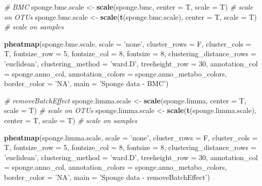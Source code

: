 \documentclass[]{book}
\newenvironment{Shaded}{\begin{snugshade}}{\end{snugshade}}
\newcommand{\KeywordTok}[1]{\textcolor[rgb]{0.13,0.29,0.53}{\textbf{#1}}}
\newcommand{\DataTypeTok}[1]{\textcolor[rgb]{0.13,0.29,0.53}{#1}}
\newcommand{\DecValTok}[1]{\textcolor[rgb]{0.00,0.00,0.81}{#1}}
\newcommand{\StringTok}[1]{\textcolor[rgb]{0.31,0.60,0.02}{#1}}
\newcommand{\CommentTok}[1]{\textcolor[rgb]{0.56,0.35,0.01}{\textit{#1}}}
\newcommand{\NormalTok}[1]{#1}
\begin{document}
\begin{Shaded}
\begin{Highlighting}[]
\CommentTok{# BMC }
\NormalTok{sponge.bmc.scale <-}\StringTok{ }\KeywordTok{scale}\NormalTok{(sponge.bmc, }\DataTypeTok{center =}\NormalTok{ T, }\DataTypeTok{scale =}\NormalTok{ T) }
\CommentTok{# scale on OTUs}
\NormalTok{sponge.bmc.scale <-}\StringTok{ }\KeywordTok{scale}\NormalTok{(}\KeywordTok{t}\NormalTok{(sponge.bmc.scale), }\DataTypeTok{center =}\NormalTok{ T, }\DataTypeTok{scale =}\NormalTok{ T) }
\CommentTok{# scale on samples}

\KeywordTok{pheatmap}\NormalTok{(sponge.bmc.scale, }
         \DataTypeTok{scale =} \StringTok{'none'}\NormalTok{, }
         \DataTypeTok{cluster_rows =}\NormalTok{ F, }
         \DataTypeTok{cluster_cols =}\NormalTok{ T, }
         \DataTypeTok{fontsize_row =} \DecValTok{5}\NormalTok{, }\DataTypeTok{fontsize_col =} \DecValTok{8}\NormalTok{,}
         \DataTypeTok{fontsize =} \DecValTok{8}\NormalTok{,}
         \DataTypeTok{clustering_distance_rows =} \StringTok{'euclidean'}\NormalTok{,}
         \DataTypeTok{clustering_method =} \StringTok{'ward.D'}\NormalTok{,}
         \DataTypeTok{treeheight_row =} \DecValTok{30}\NormalTok{,}
         \DataTypeTok{annotation_col =}\NormalTok{ sponge.anno_col,}
         \DataTypeTok{annotation_colors =}\NormalTok{ sponge.anno_metabo_colors,}
         \DataTypeTok{border_color =} \StringTok{'NA'}\NormalTok{,}
         \DataTypeTok{main =} \StringTok{'Sponge data - BMC'}\NormalTok{)}


\CommentTok{# removeBatchEffect}
\NormalTok{sponge.limma.scale <-}\StringTok{ }\KeywordTok{scale}\NormalTok{(sponge.limma, }\DataTypeTok{center =}\NormalTok{ T, }\DataTypeTok{scale =}\NormalTok{ T) }
\CommentTok{# scale on OTUs}
\NormalTok{sponge.limma.scale <-}\StringTok{ }\KeywordTok{scale}\NormalTok{(}\KeywordTok{t}\NormalTok{(sponge.limma.scale), }\DataTypeTok{center =}\NormalTok{ T, }\DataTypeTok{scale =}\NormalTok{ T) }
\CommentTok{# scale on samples}

\KeywordTok{pheatmap}\NormalTok{(sponge.limma.scale, }
         \DataTypeTok{scale =} \StringTok{'none'}\NormalTok{, }
         \DataTypeTok{cluster_rows =}\NormalTok{ F, }
         \DataTypeTok{cluster_cols =}\NormalTok{ T, }
         \DataTypeTok{fontsize_row =} \DecValTok{5}\NormalTok{, }\DataTypeTok{fontsize_col =} \DecValTok{8}\NormalTok{,}
         \DataTypeTok{fontsize =} \DecValTok{8}\NormalTok{,}
         \DataTypeTok{clustering_distance_rows =} \StringTok{'euclidean'}\NormalTok{,}
         \DataTypeTok{clustering_method =} \StringTok{'ward.D'}\NormalTok{,}
         \DataTypeTok{treeheight_row =} \DecValTok{30}\NormalTok{,}
         \DataTypeTok{annotation_col =}\NormalTok{ sponge.anno_col,}
         \DataTypeTok{annotation_colors =}\NormalTok{ sponge.anno_metabo_colors,}
         \DataTypeTok{border_color =} \StringTok{'NA'}\NormalTok{,}
         \DataTypeTok{main =} \StringTok{'Sponge data - removeBatchEffect'}\NormalTok{)}


\end{Highlighting}
\end{Shaded}
\end{document}
